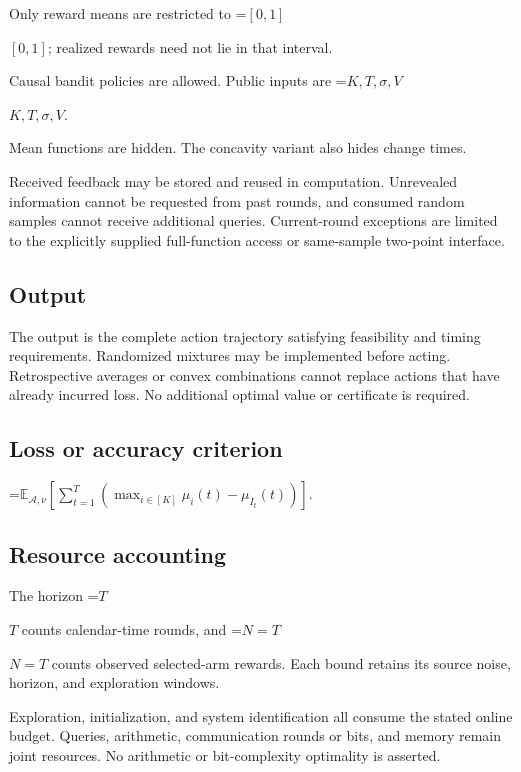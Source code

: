 \documentclass[10pt,a4paper]{article}
\newcommand{\AtlasMath}[1]{\par\begingroup\centering\setbox0=\hbox{$\displaystyle #1$}\ifdim\wd0>1.4\linewidth\typeout{ATLAS WIDE FORMULA: \the\wd0}\fi\ifdim\wd0>\linewidth\resizebox{\linewidth}{!}{\box0}\else\box0\fi\par\endgroup}
\newcommand{\AtlasInlineMath}[1]{\begingroup\setbox0=\hbox{$#1$}\ifdim\wd0>.4\linewidth\endgroup\AtlasMath{#1}\else\endgroup$#1$\fi}
\begin{document}
Only reward means are restricted to \AtlasInlineMath{[0,1]}; realized rewards need not lie in that interval.



Causal bandit policies are allowed. Public inputs are \AtlasInlineMath{K,T,\sigma,V}.



Mean functions are hidden. The concavity variant also hides change times.



Received feedback may be stored and reused in computation. Unrevealed information cannot be requested from past rounds, and consumed random samples cannot receive additional queries. Current-round exceptions are limited to the explicitly supplied full-function access or same-sample two-point interface.



\subsection{Output}


The output is the complete action trajectory satisfying feasibility and timing requirements. Randomized mixtures may be implemented before acting. Retrospective averages or convex combinations cannot replace actions that have already incurred loss. No additional optimal value or certificate is required.



\subsection{Loss or accuracy criterion}



\AtlasMath{\mathbb{E}_{\mathcal{A},\nu}\!\left[\sum_{t=1}^{T}\left(\max_{i\in[K]}\mu_i(t)-\mu_{I_t}(t)\right)\right].}




\subsection{Resource accounting}


The horizon \AtlasInlineMath{T} counts calendar-time rounds, and \AtlasInlineMath{N=T} counts observed selected-arm rewards. Each bound retains its source noise, horizon, and exploration windows.



Exploration, initialization, and system identification all consume the stated online budget. Queries, arithmetic, communication rounds or bits, and memory remain joint resources. No arithmetic or bit-complexity optimality is asserted.
\end{document}
